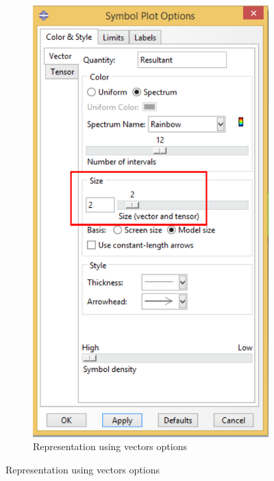 \begin{enumerate}
\begin{figure}[H]
\begin{subfigure}{0.19\textwidth}
    \end{subfigure}%
    ~ %
    \begin{subfigure}{0.35\textwidth}
      \includegraphics[width=\textwidth]{./body/images/imagen85}
      \caption{Representation using vectors options}
      \label{figu85}
    \end{subfigure}%

\end{figure}
\end{enumerate}
